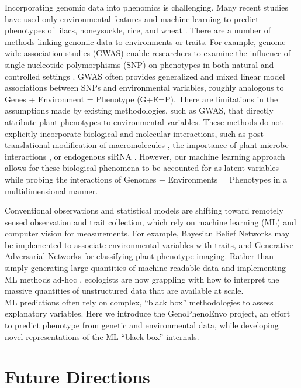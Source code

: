 \documentclass[12pt,]{article}
\begin{document}
Incorporating genomic data into phenomics is challenging. Many recent
studies have used only environmental features and machine learning to
predict phenotypes of lilacs, honeysuckle, rice, and wheat
\citep{ALDERMAN20171, nissanka2015calibration, mehdipoor2019geocomputational}.
There are a number of methods linking genomic data to environments or
traits. For example, genome wide association studies (GWAS) enable
researchers to examine the influence of single nucleotide polymorphisms
(SNP) on phenotypes in both natural and controlled settings
\citep{beyer2019loci, schlappi2017assessment, spindel2016genome}. GWAS
often provides generalized and mixed linear model associations between
SNPs and environmental variables, roughly analogous to Genes +
Environment = Phenotype (G+E=P). There are limitations in the
assumptions made by existing methodologies, such as GWAS, that directly
attribute plant phenotypes to environmental variables. These methods do
not explicitly incorporate biological and molecular interactions, such
as post-translational modification of macromolecules
\citep{running2014role}, the importance of plant-microbe interactions
\citep{oyserman2019extracting}, or endogenous siRNA
\citep{katiyar2006pathogen}. However, our machine learning approach
allows for these biological phenomena to be accounted for as latent
variables while probing the interactions of Genomes + Environments =
Phenotypes in a multidimensional manner.

Conventional observations and statistical models are shifting toward
remotely sensed observation and trait collection, which rely on machine
learning (ML) and computer vision for measurements. For example,
Bayesian Belief Networks \citep{cooper1990computational} may be
implemented to associate environmental variables with traits, and
Generative Adversarial Networks \citep{radford2015unsupervised} for
classifying plant phenotype imaging. Rather than simply generating large
quantities of machine readable data \citep{hampton2013big} and
implementing ML methods ad-hoc \citep{pichler2020machine}, ecologists
are now grappling with how to interpret the massive quantities of
unstructured data that are available at scale.\\
ML predictions often rely on complex, ``black box'' methodologies to
assess explanatory variables. Here we introduce the GenoPhenoEnvo
project, an effort to predict phenotype from genetic and environmental
data, while developing novel representations of the ML ``black-box''
internals.

\hypertarget{future-directions}{%
\section{Future Directions}\label{future-directions}}
\end{document}

